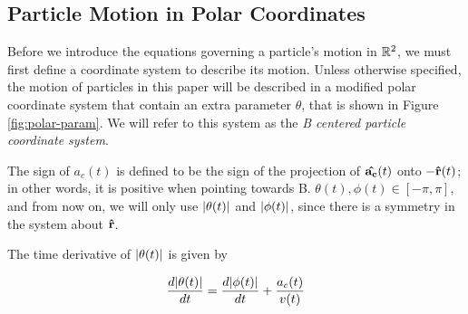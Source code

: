 \subsection{Particle Motion in Polar Coordinates}

Before we introduce the equations governing a particle's motion in $\mathbb R^2$, we must first define a coordinate system to describe its motion. Unless otherwise specified, the motion of particles in this paper will be described in a modified polar coordinate system that contain an extra parameter $\theta$, that is shown in Figure \ref{fig:polar-param}. We will refer to this system as the \textit{B centered particle coordinate system}.


The sign of $a_c(t)$ is defined to be the sign of the projection of $\mathbf{\hat{a_c}}(t)$ onto $-\mathbf{\hat{r}}(t)$; in other words, it is positive when pointing towards B. $\theta(t), \phi(t) \in [-\pi, \pi]$, and from now on, we will only use $\abs{\theta(t)}$ and $\abs{\phi(t)}$, since there is a symmetry in the system about $\mathbf{\hat{r}}$. 

\begin{lemma}
The time derivative of $\abs{\theta(t)}$ is given by

\begin{equation}\label{eq:theta-deriv}
\frac{d\abs{\theta(t)}}{dt} = \frac{d\abs{\phi(t)}}{dt} + \frac{a_c(t)}{v(t)}
\end{equation}

\end{lemma}

